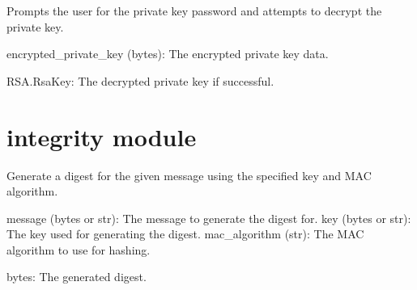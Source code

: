 \documentclass[letterpaper,10pt,english]{sphinxmanual}
\begin{document}

\begin{fulllineitems}
\label{\detokenize{get_log_messages:get_log_messages.get_private_key_password}}
\pysigstartsignatures
{}
\pysigstopsignatures
\sphinxAtStartPar
Prompts the user for the private key password and attempts to decrypt the private key.
\begin{description}
\sphinxAtStartPar
encrypted\_private\_key (bytes): The encrypted private key data.

\sphinxAtStartPar
RSA.RsaKey: The decrypted private key if successful.

\end{description}

\end{fulllineitems}


\sphinxstepscope


\section{integrity module}
\label{\detokenize{integrity:module-integrity}}\label{\detokenize{integrity:integrity-module}}\label{\detokenize{integrity::doc}}

\begin{fulllineitems}
\label{\detokenize{integrity:integrity.generate_digest}}
\pysigstartsignatures
{}
\pysigstopsignatures
\sphinxAtStartPar
Generate a digest for the given message using the specified key and MAC algorithm.
\begin{description}
\sphinxAtStartPar
message (bytes or str): The message to generate the digest for.
key (bytes or str): The key used for generating the digest.
mac\_algorithm (str): The MAC algorithm to use for hashing.

\sphinxAtStartPar
bytes: The generated digest.

\end{description}

\end{fulllineitems}
\end{document}
